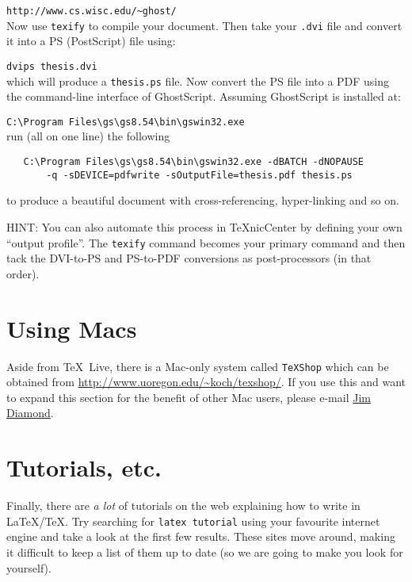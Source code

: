 \verb|http://www.cs.wisc.edu/~ghost/|
\\
Now use \verb|texify| to compile your document.  Then take your
\verb|.dvi| file and convert it into a PS (PostScript) file using:

\verb|dvips thesis.dvi|
\\
which will produce a \verb|thesis.ps| file. 
Now convert the PS file into a PDF using the 
command-line interface of GhostScript. 
Assuming GhostScript is installed at:

\verb|C:\Program Files\gs\gs8.54\bin\gswin32.exe|
\\
run (all on one line) the following
\begin{verbatim}
   C:\Program Files\gs\gs8.54\bin\gswin32.exe -dBATCH -dNOPAUSE
       -q -sDEVICE=pdfwrite -sOutputFile=thesis.pdf thesis.ps
\end{verbatim}
to produce a beautiful document with cross-referencing,
hyper-linking and so on.

HINT: You can also automate this process in TeXnicCenter by defining
your own ``output profile''.  The \verb|texify| command becomes your
primary command and then tack the DVI-to-PS and PS-to-PDF conversions
as post-processors (in that order).

\section{Using Macs}

Aside from \TeX\ Live, there is a Mac-only system called
\verb|TeXShop| which can be obtained from
\url{http://www.uoregon.edu/~koch/texshop/}.  If you use this and want
to expand this section for the benefit of other Mac users, please
e-mail \href{mailto:jim.diamond@acadiau.ca}{Jim Diamond}.


\section{Tutorials, etc.}
Finally, there are \emph{a lot} of tutorials on the web explaining how
to write in \LaTeX/\TeX.
Try searching for \verb|latex tutorial| using your favourite internet
engine and take a look at the first few results.  These sites move
around, making it difficult to keep a list of them up to date (so we
are going to make you look for yourself).

